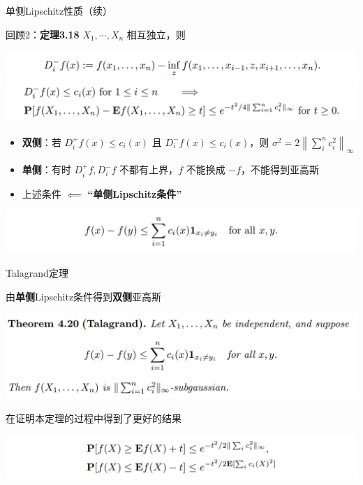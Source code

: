 \documentclass{beamer}
\begin{document}
\begin{frame}{单侧Lipschitz性质（续）}

回顾2：\textbf{定理3.18} $X_1, \cdots, X_n$ 相互独立，则
\begin{center}
    \includegraphics[width=1.0\textwidth, frame]{figures/2-4-dminus.png}
    \includegraphics[width=1.0\textwidth, frame]{figures/4-20-002.png}
\end{center}

\begin{itemize}
    \item \textbf{双侧}：若 $D_i^+ f(x)\le c_i(x)$ 且 $D_i^- f(x)\le c_i(x)$，则 $\sigma^2=2\left\|\sum_i^n c_i^2\right\|_{\infty}$
    \item \textbf{单侧}：有时 $D_i^+f, D_i^-f$ 不都有上界，$f$ 不能换成 $-f$，不能得到亚高斯
    \item 上述条件 $\impliedby$ \textbf{“单侧Lipschitz条件”}
\end{itemize}

\begin{center}
    \includegraphics[width=1.0\textwidth, frame]{figures/4-20-004.png}
\end{center}

\end{frame}

\begin{frame}{Talagrand定理}

由\textbf{单侧}Lipschitz条件得到\textbf{双侧}亚高斯

\begin{center}
    \includegraphics[width=1.0\textwidth, frame]{figures/4-20-thm.png}
\end{center}

在证明本定理的过程中得到了更好的结果

\begin{center}
    \includegraphics[width=1.0\textwidth, frame]{figures/4-20-better.png}
\end{center}

\end{frame}
\end{document}

